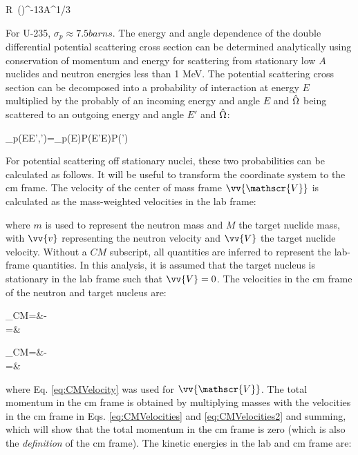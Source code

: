 \beq
R\ ()^{-13}A^{1/3}
\eeq

For U-235, \(\sigma_p\approx7.5 barns\). The energy and angle dependence of the double differential potential scattering cross section can be determined analytically using conservation of momentum and energy for scattering from stationary low \(A\) nuclides and neutron energies less than 1 MeV. The potential scattering cross section can be decomposed into a probability of interaction at energy \(E\) multiplied by the probably of an incoming energy and angle \(E\) and \(\hat{\Omega}\) being scattered to an outgoing energy and angle \(E'\) and \(\hat{\Omega}\):

\beq
\label{eq:DifferentialSigma}
\sigma_p(E\rightarrow E',\hO\rightarrow\hO')=\sigma_p(E)P(E'\rightarrow E)P(\hO\rightarrow\hO')
\eeq


\label{sec:PotentialStationary}
For potential scattering off stationary nuclei, these two probabilities can be calculated as follows. It will be useful to transform the coordinate system to the \gls{cm} frame. The velocity of the center of mass frame \(\vv{\mathscr{V}}\) is calculated as the mass-weighted velocities in the lab frame:

\beq
\label{eq:CMVelocity}
\equiv{}
\eeq

where \(m\) is used to represent the neutron mass and \(M\) the target nuclide mass, with \(\vv{v}\) representing the neutron velocity and \(\vv{V}\) the target nuclide velocity. Without a \(CM\) subscript, all quantities are inferred to represent the lab-frame quantities. In this analysis, it is assumed that the target nucleus is stationary in the lab frame such that \(\vv{V}=0\). The velocities in the \gls{cm} frame of the neutron and target nucleus are:

\beqa
\label{eq:CMVelocities}
_{CM}=&-\\
=&
\eeqa

\beqa
\label{eq:CMVelocities2}
_{CM}=&-\\
=&
\eeqa

where Eq. \eqref{eq:CMVelocity} was used for \(\vv{\mathscr{V}}\). The total momentum in the \gls{cm} frame is obtained by multiplying masses with the velocities in the \gls{cm} frame in Eqs. \eqref{eq:CMVelocities} and \eqref{eq:CMVelocities2} and summing, which will show that the total momentum in the \gls{cm} frame is zero (which is also the {\it definition} of the \gls{cm} frame). The kinetic energies in the lab and \gls{cm} frame are:

